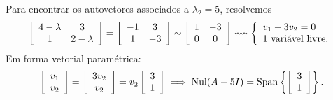 \begin{ex}
	Para encontrar os autovetores associados a $\lambda_2 = 5$, resolvemos
	\begin{equation}
	\left[
	\begin{array}{cc}
	4-\lambda & 3 \\
	1 & 2-\lambda \\
	\end{array}
	\right] =
	\left[
	\begin{array}{cc}
	-1 & 3 \\
	1 & -3 \\
	\end{array}
	\right] \sim
	\left[
	\begin{array}{cc}
	1 & -3 \\
	0 &  0 \\
	\end{array}
	\right] \leftrightsquigarrow
	\left\{
	\begin{array}{ll}
	v_1 - 3 v_2 = 0 \\
	\hbox{1 variável livre.}
	\end{array}
	\right.
	\end{equation} Em forma vetorial paramétrica:
	\begin{equation}
	\left[
	\begin{array}{c}
	v_1 \\
	v_2 \\
	\end{array}
	\right] =
	\left[
	\begin{array}{c}
	3v_2 \\
	v_2 \\
	\end{array}
	\right] = v_2
	\left[
	\begin{array}{c}
	3 \\
	1 \\
	\end{array}
	\right] \implies \operatorname{Nul} (A - 5 I) = \operatorname{Span} \left\{ \left[
	\begin{array}{c}
	3 \\
	1 \\
	\end{array}
	\right] \right\}.
	\end{equation}
\end{ex}

